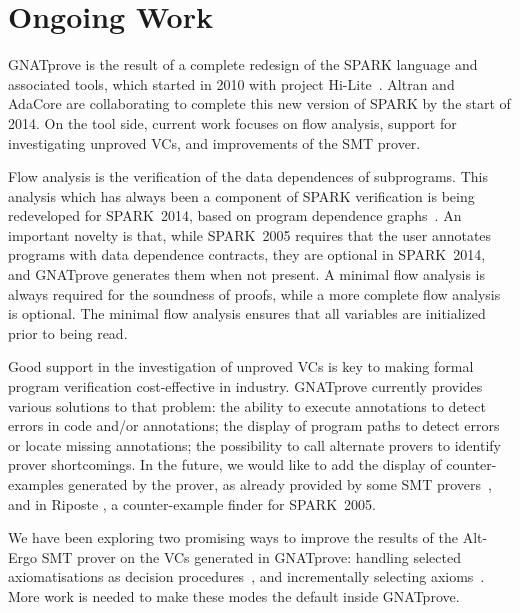 \documentclass[sttt,final]{svjour}
\newcommand{\hilite}{Hi-Lite}
\newcommand{\gnatprove}{GNATprove\xspace}
\newcommand{\oldspark}{SPARK~2005\xspace}
\newcommand{\newspark}{SPARK~2014\xspace}
\begin{document}

\section{Ongoing Work}
\label{ongoing}

\gnatprove is the result of a complete redesign of the SPARK language and
associated tools, which started in 2010 with project \hilite\ \cite{Hi-Lite}.
Altran and AdaCore are collaborating to complete this new version of SPARK by
the start of 2014. On the tool side, current work focuses on flow analysis,
support for investigating unproved VCs, and improvements of the SMT prover.

Flow analysis is the verification of the data dependences of
subprograms. This analysis which has always been a component of SPARK
verification is being redeveloped for \newspark, based on
program dependence graphs~\cite{horwitz:1988:pldi}. An important
novelty is that, while \oldspark requires that the user annotates
programs with data dependence contracts, they are optional in
\newspark, and \gnatprove generates them when not present. A minimal
flow analysis is always required for the soundness of proofs, while a
more complete flow analysis is optional. The minimal flow analysis
ensures that all variables are initialized prior to being read.

Good support in the investigation of unproved VCs is key to making
formal program verification cost-effective in industry. \gnatprove
currently provides various solutions to that problem: the ability to
execute annotations to detect errors in code and/or annotations; the
display of program paths to detect errors or locate missing
annotations; the possibility to call alternate provers to identify
prover shortcomings. In the future, we would like to add the display
of counter-examples generated by the prover, as already provided by
some SMT provers~\cite{CVC3,Z3model}, and in Riposte
\cite{riposteICLP}, a counter-example finder for \oldspark.

We have been exploring two promising ways to improve the results of the
Alt-Ergo SMT prover on the VCs generated in \gnatprove: handling selected
axiomatisations as decision procedures~\cite{dross:2012:smt}, and incrementally
selecting axioms~\cite{cgs09:ipo,kuhlwein:2012:ijcar}. More work is needed to
make these modes the default inside \gnatprove.

\end{document}

